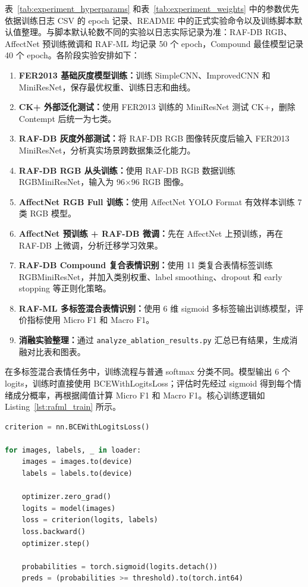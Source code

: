 \documentclass[UTF8,a4paper,12pt]{ctexart}
\newcommand{\code}[1]{\texttt{#1}}
\begin{document}
表~\ref{tab:experiment_hyperparams} 和表~\ref{tab:experiment_weights} 中的参数优先依据训练日志 CSV 的 epoch 记录、README 中的正式实验命令以及训练脚本默认值整理。与脚本默认轮数不同的实验以日志实际记录为准：RAF-DB RGB、AffectNet 预训练微调和 RAF-ML 均记录 50 个 epoch，Compound 最佳模型记录 40 个 epoch。各阶段实验安排如下：

\begin{enumerate}
  \item \textbf{FER2013 基础灰度模型训练：}训练 SimpleCNN、ImprovedCNN 和 MiniResNet，保存最优权重、训练日志和曲线。
  \item \textbf{CK+ 外部泛化测试：}使用 FER2013 训练的 MiniResNet 测试 CK+，删除 Contempt 后统一为七类。
  \item \textbf{RAF-DB 灰度外部测试：}将 RAF-DB RGB 图像转灰度后输入 FER2013 MiniResNet，分析真实场景跨数据集泛化能力。
  \item \textbf{RAF-DB RGB 从头训练：}使用 RAF-DB RGB 数据训练 RGBMiniResNet，输入为 96$\times$96 RGB 图像。
  \item \textbf{AffectNet RGB Full 训练：}使用 AffectNet YOLO Format 有效样本训练 7 类 RGB 模型。
  \item \textbf{AffectNet 预训练 + RAF-DB 微调：}先在 AffectNet 上预训练，再在 RAF-DB 上微调，分析迁移学习效果。
  \item \textbf{RAF-DB Compound 复合表情识别：}使用 11 类复合表情标签训练 RGBMiniResNet，并加入类别权重、label smoothing、dropout 和 early stopping 等正则化策略。
  \item \textbf{RAF-ML 多标签混合表情识别：}使用 6 维 sigmoid 多标签输出训练模型，评价指标使用 Micro F1 和 Macro F1。
  \item \textbf{消融实验整理：}通过 \code{analyze\_ablation\_results.py} 汇总已有结果，生成消融对比表和图表。
\end{enumerate}

在多标签混合表情任务中，训练流程与普通 softmax 分类不同。模型输出 6 个 logits，训练时直接使用 BCEWithLogitsLoss；评估时先经过 sigmoid 得到每个情绪成分概率，再根据阈值计算 Micro F1 和 Macro F1。核心训练逻辑如 Listing~\ref{lst:rafml_train} 所示。

\begin{lstlisting}[language=Python, caption={RAF-ML 多标签训练核心逻辑}, label={lst:rafml_train}]
criterion = nn.BCEWithLogitsLoss()

for images, labels, _ in loader:
    images = images.to(device)
    labels = labels.to(device)

    optimizer.zero_grad()
    logits = model(images)
    loss = criterion(logits, labels)
    loss.backward()
    optimizer.step()

    probabilities = torch.sigmoid(logits.detach())
    preds = (probabilities >= threshold).to(torch.int64)
\end{lstlisting}
\end{document}
